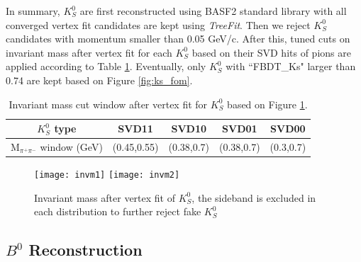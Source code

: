 In summary, $K_S^0$ are first reconstructed using BASF2 standard library with all converged vertex fit candidates are kept using \textit{TreeFit}. Then we reject $K_S^0$ candidates with momentum smaller than 0.05 GeV/c. After this, tuned cuts on invariant mass after vertex fit for each $K_S^0$ based on their SVD hits of pions are applied according to Table \ref{tab:ks_invm}. 
Eventually, only $K_S^0$ with ``FBDT\_Ks" larger than 0.74 are kept based on Figure \ref{fig:ks_fom}.
 
\begin{table}[h]
	\centering 
	\begin{tabular}{|c|c|c|c|c|} 
		\hline
		$K_S^0$ type & SVD11 & SVD10 & SVD01  & SVD00  \\
		\hline
		M$_{\pi^+\pi^-}$ window (GeV) & (0.45,0.55) & (0.38,0.7)  & (0.38,0.7)  & (0.3,0.7) \\
		\hline
	\end{tabular}
\caption{Invariant mass cut window after vertex fit for $K_S^0$ based on Figure \ref{fig:invm}.}
\label{tab:ks_invm}
\end{table}

\begin{figure}[htpb]
	\centering
	\texttt{[image: invm1]}
	\texttt{[image: invm2]}
	\caption{Invariant mass after vertex fit of $K_S^0$, the sideband is excluded in each distribution to further reject fake $K_S^0$}
	\label{fig:invm}
\end{figure}

\subsection{$B^0$  Reconstruction}

